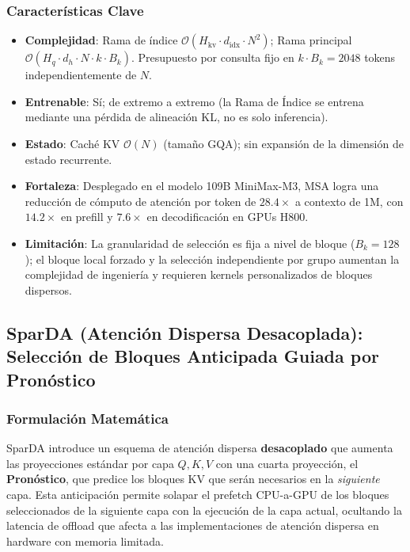 \subsubsection{Características Clave}

\begin{itemize}[leftmargin=*]
    \item \textbf{Complejidad}: Rama de índice $\mathcal{O}(H_{\text{kv}} \cdot d_{\text{idx}} \cdot N^2)$; Rama principal $\mathcal{O}(H_q \cdot d_h \cdot N \cdot k \cdot B_k)$. Presupuesto por consulta fijo en $k \cdot B_k = 2048$ tokens independientemente de $N$.
    \item \textbf{Entrenable}: Sí; de extremo a extremo (la Rama de Índice se entrena mediante una pérdida de alineación KL, no es solo inferencia).
    \item \textbf{Estado}: Caché KV $\mathcal{O}(N)$ (tamaño GQA); sin expansión de la dimensión de estado recurrente.
    \item \textbf{Fortaleza}: Desplegado en el modelo 109B MiniMax-M3, MSA logra una reducción de cómputo de atención por token de $28.4\times$ a contexto de 1M, con $14.2\times$ en prefill y $7.6\times$ en decodificación en GPUs H800.
    \item \textbf{Limitación}: La granularidad de selección es fija a nivel de bloque ($B_k = 128$); el bloque local forzado y la selección independiente por grupo aumentan la complejidad de ingeniería y requieren kernels personalizados de bloques dispersos.
\end{itemize}

\subsection{SparDA (Atención Dispersa Desacoplada): Selección de Bloques Anticipada Guiada por Pronóstico}

\subsubsection{Formulación Matemática}

SparDA \citep{fu_sparda_2026} introduce un esquema de atención dispersa \textbf{desacoplado} que aumenta las proyecciones estándar por capa $Q, K, V$ con una cuarta proyección, el \textbf{Pronóstico}, que predice los bloques KV que serán necesarios en la \emph{siguiente} capa. Esta anticipación permite solapar el prefetch CPU-a-GPU de los bloques seleccionados de la siguiente capa con la ejecución de la capa actual, ocultando la latencia de offload que afecta a las implementaciones de atención dispersa en hardware con memoria limitada.


